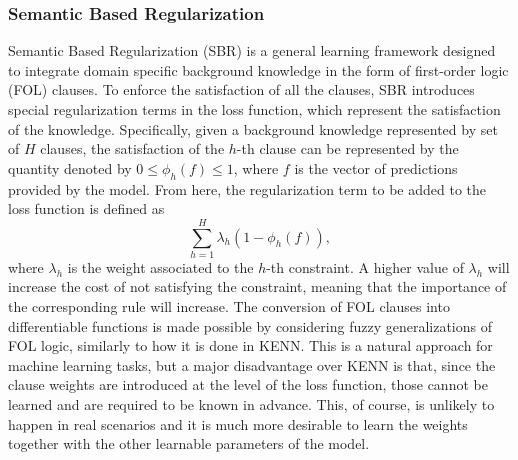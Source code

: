  
 \subsubsection{Semantic Based Regularization}
 Semantic Based Regularization (SBR) is a general learning framework designed to integrate domain specific background knowledge in the form of first-order logic (FOL) clauses. To enforce the satisfaction of all the clauses, SBR introduces special regularization terms in the loss function, which represent the satisfaction of the knowledge. Specifically, given a background knowledge represented by set of $H$ clauses, the satisfaction of the $h$-th clause can be represented by the quantity denoted by $0 \leq \phi_h(f) \leq 1$, where $f$ is the vector of predictions provided by the model. From here, the regularization term to be added to the loss function is defined as
 $$ \sum_{h=1}^H \lambda_h(1 - \phi_h(f)), $$
 where $\lambda_h$ is the weight associated to the $h$-th constraint. A higher value of $\lambda_h$ will increase the cost of not satisfying the constraint, meaning that the importance of the corresponding rule will increase. The conversion of FOL clauses into differentiable functions is made possible by considering fuzzy generalizations of FOL logic, similarly to how it is done in KENN. This is a natural approach for machine learning tasks, but a major disadvantage over KENN is that, since the clause weights are introduced at the level of the loss function, those cannot be learned and are required to be known in advance. This, of course, is unlikely to happen in real scenarios and it is much more desirable to learn the weights together with the other learnable parameters of the model.
 
